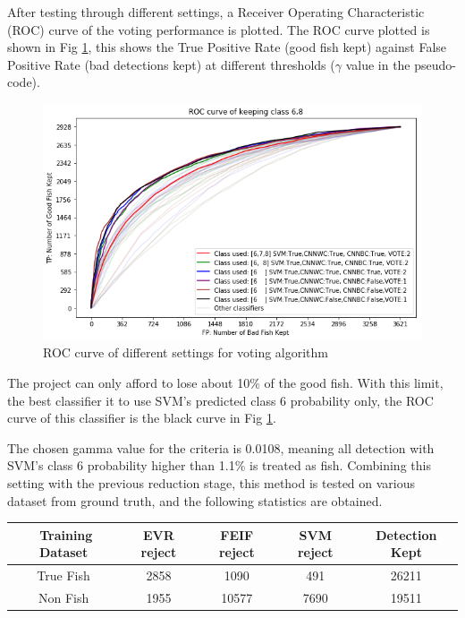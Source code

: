 \documentclass[bsc,logo,twoside,fullspacing,parskip]{infthesis}
\begin{document}
After testing through different settings, a Receiver Operating Characteristic (ROC) curve of the voting performance is plotted.
The ROC curve plotted is shown in Fig \ref{fig:roccurve}, this shows the True Positive Rate (good fish kept) against False Positive Rate (bad detections kept) at different thresholds ($\gamma$ value in the pseudo-code).

\begin{figure}[ht]
\centering
    \includegraphics[scale=0.6]{graph/roccurve.png}
    \caption{ROC curve of different settings for voting algorithm}
    \label{fig:roccurve}
\end{figure} 

The project can only afford to lose about 10\% of the good fish.
With this limit, the best classifier it to use SVM's predicted class 6 probability only, the ROC curve of this classifier is the black curve in Fig \ref{fig:roccurve}. 

The chosen gamma value for the criteria is 0.0108, meaning all detection with SVM's class 6 probability higher than 1.1\% is treated as fish.
Combining this setting with the previous reduction stage, this method is tested on various dataset from ground truth, and the following statistics are obtained.

\begin{center}
\begin{tabular}{|c|c|c|c|c|}
\hline 
$ $ Training Dataset & EVR reject & FEIF reject & SVM reject & Detection Kept\\
\hline 
True Fish & 2858 & 1090 & 491 & 26211 \\
Non Fish & 1955 & 10577 & 7690 & 19511 \\
\hline 
\end{tabular}
\end{center}
\end{document}

